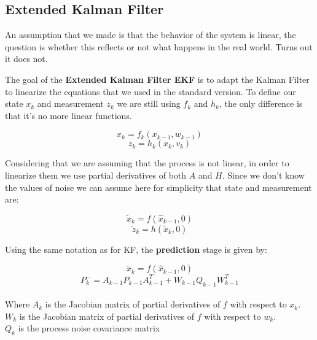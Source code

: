 \subsection{Extended Kalman Filter}

An assumption that we made is that the behavior of the system is linear, the question is whether this reflects or not what happens in the real world. Turns out it does not.

The goal of the \textbf{Extended Kalman Filter EKF} is to adapt the Kalman Filter to linearize the equations that we used in the standard version. To define our state $x_k$ and measurement $z_k$ we are still using  $f_k$ and $h_k$, the only difference is that it's no more linear functions.

\[
  x_k = f_k(x_{k-1}, w_{k-1})  
\]
\[
    z_k = h_k(x_k, v_k)    
\]

Considering that we are assuming that the process is not linear, in order to linearize them we use partial derivatives of both $A$ and $H$. Since we don't know the values of noise we can assume here for simplicity that state and measurement are:

\[
    \tilde{x}_k = f(\hat{x}_{k-1},0)    
\]
\[
    \tilde{z}_k =  h(\tilde{x}_k,0)   
\]

Using the same notation as for KF, the \textbf{prediction} stage is given by:

\[
    \tilde{x}_k = f(\hat{x}_{k-1},0)    
\]
\[
    P^-_k = A_{k-1}P_{k-1}A^T_{k-1}+W_{k-1}Q_{k-1}W^T_{k-1}    
\]
\\
Where $A_k$ is the Jacobian matrix of partial derivatives of $f$ with respect to $x_k$.\\
$W_k$ is the Jacobian matrix of partial derivatives of $f$ with respect to $w_k$.\\
$Q_k$ is the process noise covariance matrix